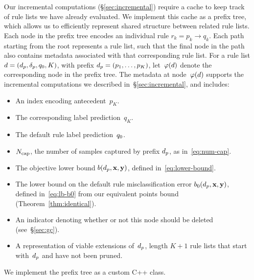 Our incremental computations (\S\ref{sec:incremental}) require a
cache to keep track of rule lists we have already evaluated.
%
We implement this cache as a prefix tree, which allows us to efficiently
represent shared structure between related rule lists.
%
Each node in the prefix tree encodes an individual rule ${r_k = p_k \rightarrow q_k}$.
%
Each path starting from the root represents a rule list, such that the final node
in the path also contains metadata associated with that corresponding rule list.
%
For a rule list ${{d} = (d_p, \delta_p, q_0, K)}$,
with prefix ${d_p = (p_1, \dots, p_K)}$,
let~$\varphi({d})$ denote the corresponding node in the prefix tree.
%
The metadata at node~$\varphi({d})$ supports the incremental computations
we described in~\S\ref{sec:incremental}, and includes:
\begin{itemize}
\item An index encoding antecedent~$p_K$.
\item The corresponding label prediction~$q_K$.
\item The default rule label prediction~$q_0$.
\item $N_{\textnormal{cap}}$, the number of samples captured by prefix $d_p$, as in~\eqref{eq:num-cap}. %
\item The objective lower bound $b(d_p, \mathbf{x}, \mathbf{y})$, defined in~\eqref{eq:lower-bound}.
\item The lower bound on the default rule misclassification error
  $b_0(d_p, \mathbf{x}, \mathbf{y})$, defined in~\eqref{eq:lb-b0}
  from our equivalent points bound (Theorem~\ref{thm:identical}).
\item An indicator denoting whether or not this node should be deleted (see~\S\ref{sec:gc}).
\item A representation of viable extensions of~$d_p$,
  \ie length ${K+1}$ rule lists that start with~$d_p$ and have not been pruned.
\end{itemize}
We implement the prefix tree as a custom C++ class. %
%
%

